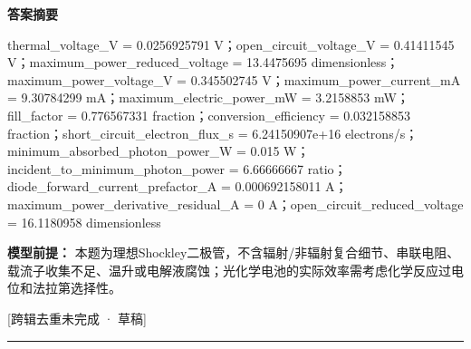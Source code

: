 \documentclass[UTF8,11pt,a4paper]{ctexart}
\begin{document}
\noindent\textbf{答案摘要}\par
thermal\_voltage\_V = 0.0256925791 V；open\_circuit\_voltage\_V = 0.41411545 V；maximum\_power\_reduced\_voltage = 13.4475695 dimensionless；maximum\_power\_voltage\_V = 0.345502745 V；maximum\_power\_current\_mA = 9.30784299 mA；maximum\_electric\_power\_mW = 3.2158853 mW；fill\_factor = 0.776567331 fraction；conversion\_efficiency = 0.032158853 fraction；short\_circuit\_electron\_flux\_s = 6.24150907e+16 electrons/s；minimum\_absorbed\_photon\_power\_W = 0.015 W；incident\_to\_minimum\_photon\_power = 6.66666667 ratio；diode\_forward\_current\_prefactor\_A = 0.000692158011 A；maximum\_power\_derivative\_residual\_A = 0 A；open\_circuit\_reduced\_voltage = 16.1180958 dimensionless\par
\noindent\textbf{模型前提：}
本题为理想Shockley二极管，不含辐射/非辐射复合细节、串联电阻、载流子收集不足、温升或电解液腐蚀；光化学电池的实际效率需考虑化学反应过电位和法拉第选择性。\par
\noindent\textcolor{red!65!black}{[跨辑去重未完成 · 草稿]} \par
\medskip\hrule\medskip
{}
\end{document}
